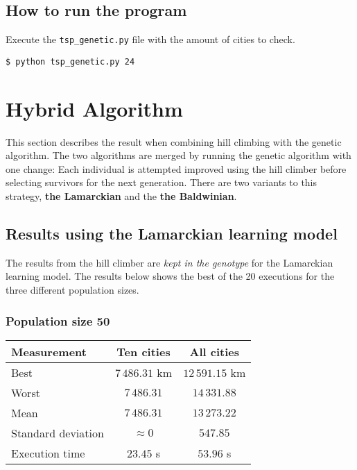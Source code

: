 \documentclass{article}
\begin{document}
\subsection*{How to run the program}

Execute the \texttt{tsp\_genetic.py} file with the amount of cities to check.

\begin{verbatim}
$ python tsp_genetic.py 24
\end{verbatim}

\section*{Hybrid Algorithm}

This section describes the result when combining hill climbing with the genetic algorithm. The two algorithms are merged by running the genetic algorithm with one change: Each individual is attempted improved using the hill climber before selecting survivors for the next generation. There are two variants to this strategy, \textbf{the Lamarckian} and the \textbf{the Baldwinian}.

\subsection*{Results using the Lamarckian learning model}

The results from the hill climber are \textit{kept in the genotype} for the Lamarckian learning model. The results below shows the best of the 20 executions for the three different population sizes.

\subsubsection*{Population size 50}

\begin{center}
\begin{tabular}{lcc}
\toprule
Measurement & Ten cities & All cities \\
\midrule
Best & $7\,486.31$ km & $12\,591.15$ km \\
Worst & $7\,486.31$ & $14\,331.88$ \\
Mean & $7\,486.31$ & $13\,273.22$ \\
Standard deviation & $\approx 0$ & $547.85$ \\
Execution time & $23.45$ s & $53.96$ s \\
\bottomrule
\end{tabular}
\end{center}
\end{document}
